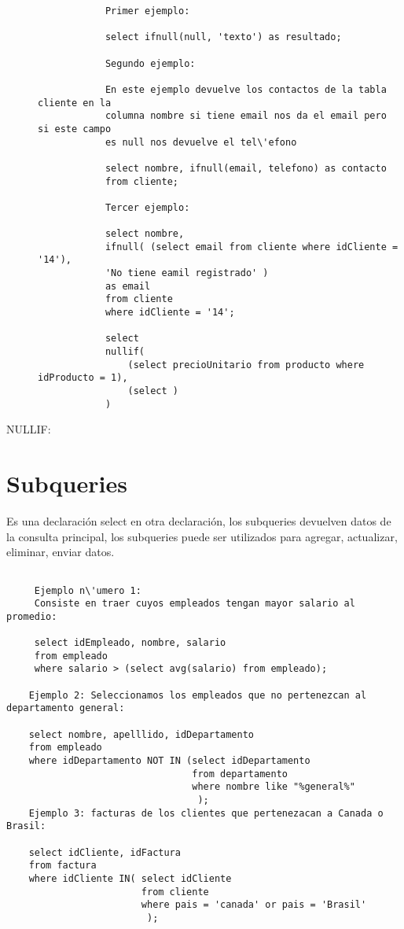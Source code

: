 \begin{description}
\begin{example}
\begin{verbatim}
			Primer ejemplo: 
			
			select ifnull(null, 'texto') as resultado;
			
			Segundo ejemplo: 
			
			En este ejemplo devuelve los contactos de la tabla cliente en la
			columna nombre si tiene email nos da el email pero si este campo
			es null nos devuelve el tel\'efono
			
			select nombre, ifnull(email, telefono) as contacto
			from cliente;
			
			Tercer ejemplo: 
			
			select nombre,
			ifnull( (select email from cliente where idCliente = '14'), 
			'No tiene eamil registrado' )
			as email 
			from cliente
			where idCliente = '14';
			
			select 
			nullif(
				(select precioUnitario from producto where idProducto = 1),
				(select )
			)
		\end{verbatim}
	\end{example}
	
	\item[NULLIF:]

\end{description}

\section{Subqueries}
Es una declaraci\'on select en otra declaraci\'on, los subqueries devuelven datos de la consulta principal, los subqueries puede ser utilizados para agregar, actualizar, eliminar, enviar datos.

\begin{example}
	\begin{verbatim}
		
	 Ejemplo n\'umero 1: 
	 Consiste en traer cuyos empleados tengan mayor salario al promedio: 
	 
	 select idEmpleado, nombre, salario
	 from empleado
	 where salario > (select avg(salario) from empleado);

	Ejemplo 2: Seleccionamos los empleados que no pertenezcan al departamento general: 
	
	select nombre, apelllido, idDepartamento
	from empleado
	where idDepartamento NOT IN (select idDepartamento 
	                             from departamento
	                             where nombre like "%general%"
	                              );
	Ejemplo 3: facturas de los clientes que pertenezacan a Canada o Brasil:
	
	select idCliente, idFactura
	from factura
	where idCliente IN( select idCliente 
						from cliente
						where pais = 'canada' or pais = 'Brasil'
						 );
	
	\end{verbatim}
\end{example}


